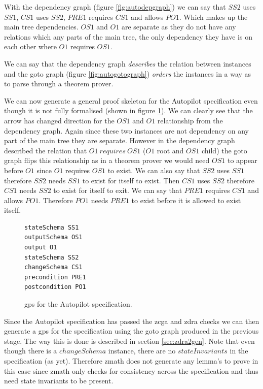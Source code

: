 With the dependency graph (figure \ref{fig:autodepgraph}) we can say that $SS2$
uses $SS1$, $CS1$ uses $SS2$, $PRE1$ requires $CS1$ and allows $PO1$. Which
makes up the main tree dependencies. $OS1$ and $O1$ are separate as they do not
have any relations which any parts of the main tree, the only dependency they
have is on each other where $O1$ requires $OS1$.

We can say that the dependency graph \emph{describes} the relation between
instances and the goto graph (figure \ref{fig:autogotograph}) \emph{orders} the
instances in a way as to parse through a theorem prover.

We can now generate a general proof skeleton for the Autopilot specification
even though it is not fully formalised (shown in figure \ref{fig:autopilotgps}).
We can clearly see that the arrow has changed direction for the $OS1$ and $O1$
relationship from the dependency graph. Again since these two instances are not
dependency on any part of the main tree they are separate. However in the
dependency graph described the relation that $O1\ requires\ OS1$ ($O1$ root and
$OS1$ child) the goto graph flips this relationship as in a theorem prover we
would need $OS1$ to appear before $O1$ since $O1$ requires $OS1$ to exist. We can
also say that $SS2$ uses $SS1$ therefore $SS2$ needs $SS1$ to exist for itself
to exist. Then $CS1$ uses $SS2$ therefore $CS1$ needs $SS2$ to exist for itself
to exit. We can say that $PRE1$ requires $CS1$ and allows $PO1$. Therefore $PO1$
needs $PRE1$ to exist before it is allowed to exist itself.

\begin{figure}[H]
\centering
\begin{center}
\begin{verbatim}
stateSchema SS1 
outputSchema OS1 
output O1 
stateSchema SS2 
changeSchema CS1 
precondition PRE1 
postcondition PO1 
\end{verbatim}
\end{center}
\caption{\Gls{gps} for the Autopilot specification. \label{fig:autopilotgps}}
\end{figure}

Since the Autopilot specification has passed the \gls{zcga} and \gls{zdra}
checks we can then generate a \gls{gps} for the specification using the goto
graph produced in the previous stage. The way this is done is described in
section \ref{sec:zdra2gen}. Note that even though there is a $changeSchema$
instance, there are no $stateInvariants$ in the specification (as yet).
Therefore \gls{zmath} does not generate any lemma's to prove in this case since
\gls{zmath} only checks for consistency across the specification and thus need
state invariants to be present.

